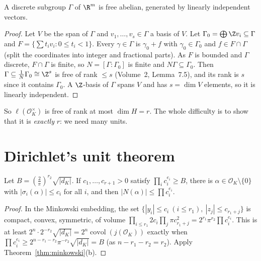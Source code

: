 \begin{lemma}\label{lem:discrete}
A discrete subgroup $\Gamma$ of $\R^m$ is free abelian, generated by linearly independent vectors.
\end{lemma}
\begin{proof}
Let $V$ be the span of $\Gamma$ and $v_1,\dots,v_s\in\Gamma$ a basis of $V$. Let $\Gamma_0=\bigoplus\Z v_i\subseteq\Gamma$
and $F=\{\sum t_iv_i:0\le t_i<1\}$. Every $\gamma\in\Gamma$ is $\gamma_0+f$ with $\gamma_0\in\Gamma_0$ and $f\in F\cap\Gamma$
(split the coordinates into integer and fractional parts). As $F$ is bounded and $\Gamma$ discrete, $F\cap\Gamma$ is finite, so
$N=[\Gamma:\Gamma_0]$ is finite and $N\Gamma\subseteq\Gamma_0$. Then $\Gamma\subseteq\frac1N\Gamma_0\cong\Z^s$ is free of rank
$\le s$ (Volume~2, Lemma~7.5), and its rank is $s$ since it contains $\Gamma_0$. A $\Z$-basis of $\Gamma$ spans $V$ and has
$s=\dim V$ elements, so it is linearly independent.
\end{proof}

So $\ell(\mathcal O_K^\times)$ is free of rank at most $\dim H=r$. The whole difficulty is to show that it is \emph{exactly}
$r$: we need many units.

\section{Dirichlet's unit theorem}

\begin{lemma}\label{lem:smallbox}
Let $B=(\frac2\pi)^{r_2}\sqrt{|d_K|}$. If $c_1,\dots,c_{r+1}>0$ satisfy $\prod_ic_i^{e_i}\ge B$, there is $\alpha\in\mathcal
O_K\setminus\{0\}$ with $|\sigma_i(\alpha)|\le c_i$ for all $i$, and then $|N(\alpha)|\le\prod c_i^{e_i}$.
\end{lemma}
\begin{proof}
In the Minkowski embedding, the set $\{|y_i|\le c_i\ (i\le r_1),\ |z_j|\le c_{r_1+j}\}$ is compact, convex, symmetric, of
volume $\prod_{i\le r_1}2c_i\prod_j\pi c_{r_1+j}^2=2^{r_1}\pi^{r_2}\prod c_i^{e_i}$. This is at least $2^n\cdot2^{-r_2}\sqrt{|d_K|}=
2^n\operatorname{covol}(j(\mathcal O_K))$ exactly when $\prod c_i^{e_i}\ge2^{n-r_1-r_2}\pi^{-r_2}\sqrt{|d_K|}=B$ (as
$n-r_1-r_2=r_2$). Apply Theorem~\ref{thm:minkowski}(b).
\end{proof}

